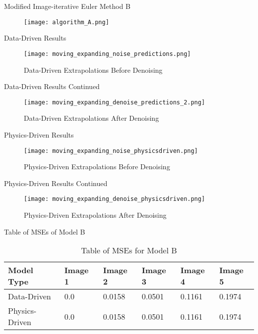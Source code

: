 \documentclass[aspectratio=169,xcolor=dvipsnames]{beamer}
\begin{document}
\begin{frame}{Modified Image-iterative Euler Method B}

    \begin{figure}
        \centering
        \texttt{[image: algorithm\_A.png]}
    \end{figure}
\end{frame}

\begin{frame}{Data-Driven Results}
    \begin{figure}
        \centering
        \texttt{[image: moving\_expanding\_noise\_predictions.png]}
        \caption{Data-Driven Extrapolations Before Denoising}
    \end{figure}
\end{frame}

\begin{frame}{Data-Driven Results Continued}
    \begin{figure}
        \centering
        \texttt{[image: moving\_expanding\_denoise\_predictions\_2.png]}
        \caption{Data-Driven Extrapolations After Denoising}
    \end{figure}
\end{frame}

\begin{frame}{Physics-Driven Results}
    \begin{figure}
        \centering
        \texttt{[image: moving\_expanding\_noise\_physicsdriven.png]}
        \caption{Physics-Driven Extrapolations Before Denoising}
    \end{figure}
\end{frame}

\begin{frame}{Physics-Driven Results Continued}
    \begin{figure}
        \centering
        \texttt{[image: moving\_expanding\_denoise\_physicsdriven.png]}
        \caption{Physics-Driven Extrapolations After Denoising}
    \end{figure}
\end{frame}

\begin{frame}{Table of MSEs of Model B}
    \begingroup
\singlespacing
\begin{table}[!h]
\centering
\begin{tabular}{|p{2cm}|p{2cm}|p{2cm}|p{2cm}|p{2cm}|p{2cm}|}
\hline
\textbf{Model Type} & \textbf{Image 1} & \textbf{Image 2} & \textbf{Image 3} & \textbf{Image 4} &
\textbf{Image 5}\\
\hline
 Data-Driven & 0.0  & 0.0158  & 0.0501 & 0.1161 & 0.1974  \\
\hline
Physics-Driven & 0.0 & 0.0158 & 0.0501 & 0.1161 &
0.1974 \\
\hline

\end{tabular}
\caption{Table of MSEs for Model B}
\label{tab:mse_ch4}
\end{table}
\endgroup
\end{frame}
\end{document}
